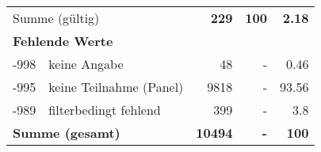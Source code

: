 \begin{longtable}{lXrrr}
     \midrule
     \multicolumn{2}{l}{Summe (gültig)} &
       \textbf{\num{229}} &
     \textbf{100} &
       \textbf{\num[round-mode=places,round-precision=2]{2,18}} \\
     \multicolumn{5}{l}{\textbf{Fehlende Werte}}\\
       -998 &
       keine Angabe &
         \num{48} &
        - &
         \num[round-mode=places,round-precision=2]{0,46} \\
       -995 &
       keine Teilnahme (Panel) &
         \num{9818} &
        - &
         \num[round-mode=places,round-precision=2]{93,56} \\
       -989 &
       filterbedingt fehlend &
         \num{399} &
        - &
         \num[round-mode=places,round-precision=2]{3,8} \\
     \midrule
     \multicolumn{2}{l}{\textbf{Summe (gesamt)}} &
          \textbf{\num{10494}} &
        \textbf{-} &
        \textbf{100} \\
     \bottomrule
     \end{longtable}
     
